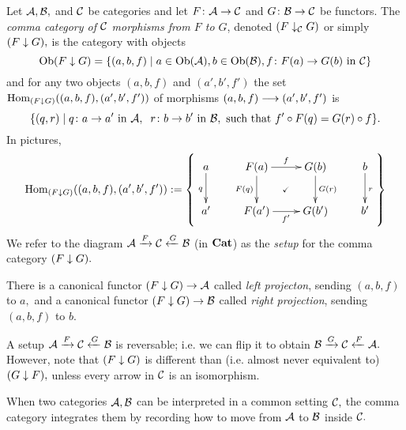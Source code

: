 \documentclass[CT4S-EN-RU]{subfiles}
\begin{document}
\begin{definitionENG}\label{def:comma category}
Let $\mathcal{A},\mathcal{B},$ and $\mathcal{C}$ be categories and let $F\colon\mathcal{A}\rightarrow\mathcal{C}$ and $G\colon\mathcal{B}\rightarrow\mathcal{C}$ be functors. The {\em comma category of $\mathcal{C}$ morphisms from $F$ to $G$}, denoted $(F\downarrow_\mathcal{C} G)$ or simply $(F\downarrow G),$ is the category with objects $$\textnormal{Ob}(F\downarrow G)=\{(a,b,f){\;|\;}a\in\textnormal{Ob}(\mathcal{A}), b\in\textnormal{Ob}(\mathcal{B}), f\colon F(a)\rightarrow G(b)\textnormal{ in }\mathcal{C}\}$$ and for any two objects $(a,b,f)$ and $(a',b',f')$ the set $\textnormal{Hom}_{(F\downarrow G)}((a,b,f),(a',b',f'))$ of morphisms $(a,b,f)\longrightarrow(a',b',f')$ is 
$$\{(q,r){\;|\;}q\colon a\rightarrow a'\textnormal{ in }\mathcal{A},\;\; r\colon b\rightarrow b'\textnormal{ in }\mathcal{B},\textnormal{ such that } f'\circ F(q)=G(r)\circ f\}.$$
In pictures,
$$\Hom_{(F\down G)}((a,b,f),(a',b',f')):=\left\{\parbox{2in}{\xymatrix{
a\ar[d]_q&F(a)\ar@{}[dr]|{\checkmark}\ar[r]^f\ar[d]_{F(q)}&G(b)\ar[d]^{G(r)}&b\ar[d]^r\\
a'&F(a')\ar[r]_{f'}&G(b')&b'
}}\right\}$$
We refer to the diagram $\mathcal{A}\xrightarrow{F}\mathcal{C}\xleftarrow{G}\mathcal{B}$ (in ${\mathbf{Cat}}$) as the {\em setup} for the comma category $(F\downarrow G).$

There is a canonical functor $(F\downarrow G)\rightarrow\mathcal{A}$ called {\em left projecton}, sending $(a,b,f)$ to $a,$ and a canonical functor $(F\downarrow G)\rightarrow\mathcal{B}$ called {\em right projection}, sending $(a,b,f)$ to $b.$ 
\end{definitionENG}

\begin{definitionRUS}\label{def:comma category}
\end{definitionRUS}

\begin{blockENG}
A setup $\mathcal{A}\xrightarrow{F}\mathcal{C}\xleftarrow{G}\mathcal{B}$ is reversable; i.e. we can flip it to obtain $\mathcal{B}\xrightarrow{G}\mathcal{C}\xleftarrow{F}\mathcal{A}.$ However, note that $(F\downarrow G)$ is different than (i.e. almost never equivalent to) $(G\downarrow F),$ unless every arrow in $\mathcal{C}$ is an isomorphism.
\end{blockENG}

\begin{blockRUS}
\end{blockRUS}

\begin{sloganENG}
When two categories $\mathcal{A},\mathcal{B}$ can be interpreted in a common setting $\mathcal{C},$ the comma category integrates them by recording how to move from $\mathcal{A}$ to $\mathcal{B}$ inside $\mathcal{C}.$
\end{sloganENG}

\begin{sloganRUS}
\end{sloganRUS}
\end{document}

